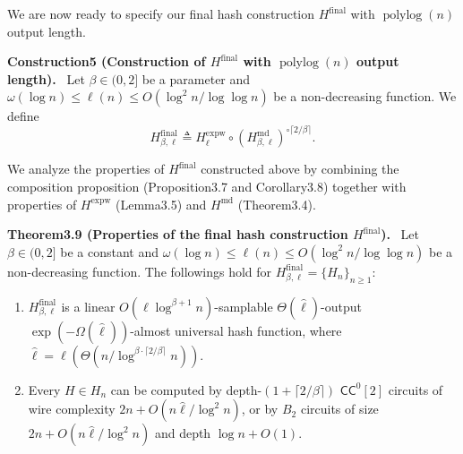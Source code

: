 \documentclass[10pt,a4paper]{article}
\newenvironment{authorclaim}[1]{\par\medskip\noindent\textbf{#1.}\ }{\par\medskip}
\begin{document}
We are now ready to specify our final hash construction $H^{\mathrm{final}}$ with $\operatorname{polylog}(n)$ output length.
\begin{authorclaim}{Construction5 (Construction of $H^{\mathrm{final}}$ with $\operatorname{polylog}(n)$ output length)}
Let $\beta\in(0,2]$ be a parameter and $\omega(\log n)\le\ell(n)\le O(\log^2n/\log\log n)$ be a non-decreasing function. We define
\[H^{\mathrm{final}}_{\beta,\ell}\triangleq H^{\mathrm{expw}}_\ell\circ(H^{\mathrm{md}}_{\beta,\ell})^{\circ\lceil2/\beta\rceil}.\]
\end{authorclaim}
We analyze the properties of $H^{\mathrm{final}}$ constructed above by combining the composition proposition (Proposition3.7 and Corollary3.8) together with properties of $H^{\mathrm{expw}}$ (Lemma3.5) and $H^{\mathrm{md}}$ (Theorem3.4).
\begin{authorclaim}{Theorem3.9 (Properties of the final hash construction $H^{\mathrm{final}}$)}
Let $\beta\in(0,2]$ be a constant and $\omega(\log n)\le\ell(n)\le O(\log^2n/\log\log n)$ be a non-decreasing function. The followings hold for $H^{\mathrm{final}}_{\beta,\ell}=\{H_n\}_{n\ge1}$:
\begin{enumerate}
\item $H^{\mathrm{final}}_{\beta,\ell}$ is a linear $O(\ell\log^{\beta+1}n)$-samplable $\Theta(\hat\ell)$-output $\exp(-\Omega(\hat\ell))$-almost universal hash function, where $\hat\ell=\ell(\Theta(n/\log^{\beta\cdot\lceil2/\beta\rceil}n))$.
\item Every $H\in H_n$ can be computed by depth-$(1+\lceil2/\beta\rceil)$ $\mathsf{CC}^0[2]$ circuits of wire complexity $2n+O(n\hat\ell/\log^2n)$, or by $B_2$ circuits of size $2n+O(n\hat\ell/\log^2n)$ and depth $\log n+O(1)$.
\end{enumerate}
\end{authorclaim}
\end{document}
